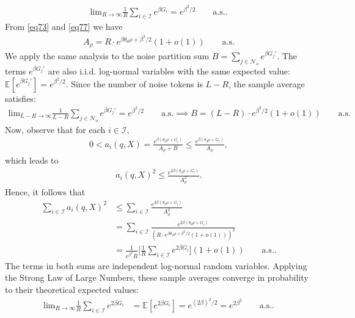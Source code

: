 \documentclass[11pt,a4paper]{article}
\theoremstyle{definition}
\begin{document}
\begin{align}
\text{lim}_{R \rightarrow \infty} \frac{1}{R} \sum_{i \in \mathcal{I}} e^{\beta G_i} = e^{\beta^2 / 2} \qquad\text{a.s.} \label{eq77}.
\end{align}
From \eqref{eq73} and \eqref{eq77} we have 
\begin{align}
A_{\rho} = R \cdot e^{\beta \theta_d \rho + \beta^2 / 2} \left( 1 + o(1) \right) \qquad\text{a.s.}
\end{align}
We apply the same analysis to the noise partition sum $B = \sum_{j \in \mathcal{N}_o} e^{\beta G_j'}$. The terms $e^{\beta G_j'}$ are also i.i.d. log-normal variables with the same expected value: $\mathbb{E}[e^{\beta G_j'}] = e^{\beta^2 / 2}$. Since the number of noise tokens is $L-R$, the sample average satisfies:
\begin{align}
\text{lim}_{L-R \rightarrow \infty} \frac{1}{L-R} \sum_{j \in \mathcal{N}_o} e^{\beta G_j'} = e^{\beta^2 / 2} \qquad\text{a.s.} \implies B = (L-R) \cdot e^{\beta^2 / 2} \left( 1 + o(1) \right) \qquad\text{a.s.}
\end{align}
Now, observe that for each $i \in  \mathcal{I}$,
\begin{align}
0<a_i(q, X) = \frac{e^{\beta(\theta_d \rho + G_i)}}{A_{\rho} + B} \leq  \frac{e^{\beta(\theta_d \rho + G_i)}}{A_{\rho} },
\end{align}
which leads to 
\begin{align}
a_i(q,X)^2 \leq \frac{e^{2\beta(\theta_d \rho + G_i)}}{A_{\rho}^2 }.
\end{align}
Hence, it follows that
\begin{align}
\sum_{i \in \mathcal{I}} a_i(q, X)^2 &\leq \sum_{i \in \mathcal{I}}\frac{e^{2\beta(\theta_d \rho + G_i)}}{A_{\rho}^2 }\\
&= \sum_{i \in \mathcal{I}}\frac{e^{2\beta(\theta_d \rho + G_i)}}{(R \cdot e^{\beta \theta_d \rho + \beta^2 / 2} \left( 1 + o(1) \right))^2 }\\
&= \frac{1}{e^{\beta^2} R} \bigg[\frac{1}{R} \sum_{i \in \mathcal{I}}e^{2\beta G_i}\bigg](1+o(1)) \qquad\text{a.s.} \label{K1}. 
\end{align}
The terms in both sums are independent log-normal random variables. Applying the Strong Law of Large Numbers, these sample averages converge in probability to their theoretical expected values:
\begin{align}
\text{lim}_{R \rightarrow \infty} \frac{1}{R} \sum_{i \in \mathcal{I}} e^{2 \beta G_i} &= \mathbb{E}\left[ e^{2 \beta G_i} \right] = e^{(2\beta)^2 / 2} = e^{2 \beta^2}  \qquad\text{a.s.} \label{K2}.
\end{align}
\end{document}
